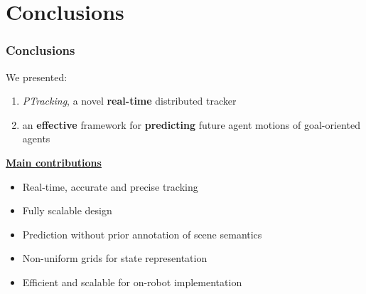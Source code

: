 \section{Conclusions}

\begin{frame}
	\frametitle{Conclusions}
	
	\Large
	
	\vspace{0.3cm}
	
	We presented:
	
	\begin{enumerate}
		\item \emph{PTracking}, a novel \textbf{real-time} distributed tracker
		\item an \textbf{effective} framework for \textbf{predicting} future agent motions of
			  goal-oriented agents
	\end{enumerate}
	
	\vspace{0.2cm}
	
	\underline{\textbf{Main contributions}}
	
	\begin{itemize}
		\item Real-time, accurate and precise tracking
		\item Fully scalable design
		\item Prediction without prior annotation of scene semantics
		\item Non-uniform grids for state representation
		\item Efficient and scalable for on-robot implementation
	\end{itemize}
\end{frame}

